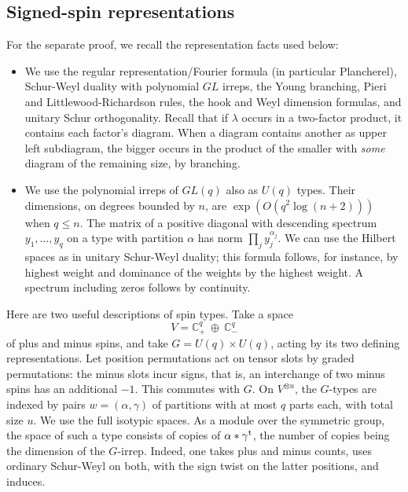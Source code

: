 \subsection{Signed-spin representations}
For the separate proof, we recall the representation facts used below:

\begin{itemize}
\item We use the regular representation/Fourier formula (in particular Plancherel), Schur-Weyl duality with polynomial \(GL\) irreps, the Young branching, Pieri and Littlewood-Richardson rules, the hook and Weyl dimension formulas, and unitary Schur orthogonality. Recall that if \(\lambda\) occurs in a two-factor product, it contains each factor's diagram. When a diagram contains another as upper left subdiagram, the bigger occurs in the product of the smaller with \emph{some} diagram of the remaining size, by branching.
\item We use the polynomial irreps of \(GL(q)\) also as \(U(q)\) types. Their dimensions, on degrees bounded by \(n\), are \(\exp(O(q^2\log(n+2)))\) when \(q\le n\). The matrix of a positive diagonal with descending spectrum \(y_1,\ldots,y_q\) on a type with partition \(\alpha\) has norm \(\prod_j y_j^{\alpha_j}\). We can use the Hilbert spaces as in unitary Schur-Weyl duality; this formula follows, for instance, by highest weight and dominance of the weights by the highest weight. A spectrum including zeros follows by continuity.
\end{itemize}

Here are two useful descriptions of spin types. Take a space
\[
 V=\mathbb C^q_+\ \oplus\ \mathbb C^q_-
\]
of plus and minus spins, and take \(G=U(q)\times U(q)\), acting by its two defining representations. Let position permutations act on tensor slots by graded permutations: the minus slots incur signs, that is, an interchange of two minus spins has an additional \(-1\). This commutes with \(G\). On \(V^{\otimes u}\), the \(G\)-types are indexed by pairs \(w=(\alpha,\gamma)\) of partitions with at most \(q\) parts each, with total size \(u\). We use the full isotypic spaces. As a module over the symmetric group, the space of such a type consists of copies of \(\alpha*\gamma^{\rm t}\), the number of copies being the dimension of the \(G\)-irrep. Indeed, one takes plus and minus counts, uses ordinary Schur-Weyl on both, with the sign twist on the latter positions, and induces.

